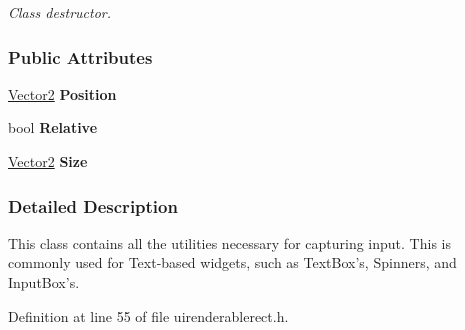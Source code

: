 \begin{DoxyCompactItemize}
\begin{DoxyCompactList}\small\item\em Class destructor. \item\end{DoxyCompactList}\end{DoxyCompactItemize}
\subsubsection*{Public Attributes}
\begin{DoxyCompactItemize}
\item 
\hypertarget{structphys_1_1UI_1_1RenderableRect_abe9af45af2ae0fdd6e6a1cb08151893d}{
\hyperlink{classphys_1_1Vector2}{Vector2} {\bfseries Position}}
\label{structphys_1_1UI_1_1RenderableRect_abe9af45af2ae0fdd6e6a1cb08151893d}

\item 
\hypertarget{structphys_1_1UI_1_1RenderableRect_a00b0874fd4d368f4ec1a6cd06dd81f46}{
bool {\bfseries Relative}}
\label{structphys_1_1UI_1_1RenderableRect_a00b0874fd4d368f4ec1a6cd06dd81f46}

\item 
\hypertarget{structphys_1_1UI_1_1RenderableRect_adb0734b93ab4c89a522bca5e20593edc}{
\hyperlink{classphys_1_1Vector2}{Vector2} {\bfseries Size}}
\label{structphys_1_1UI_1_1RenderableRect_adb0734b93ab4c89a522bca5e20593edc}

\end{DoxyCompactItemize}


\subsubsection{Detailed Description}
This class contains all the utilities necessary for capturing input. This is commonly used for Text-\/based widgets, such as TextBox's, Spinners, and InputBox's. 

Definition at line 55 of file uirenderablerect.h.



